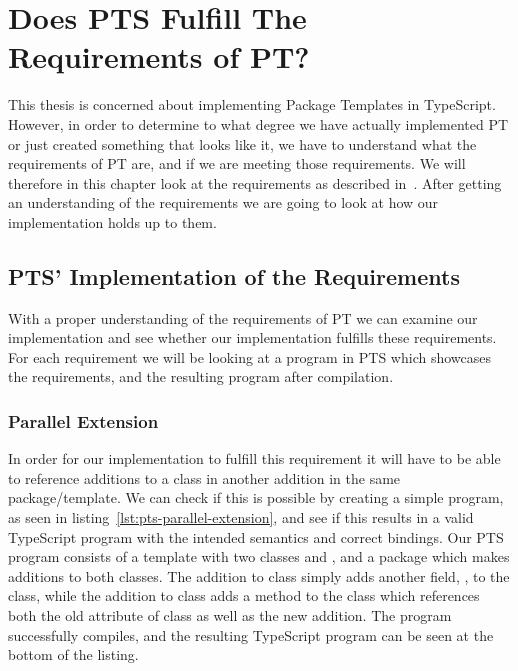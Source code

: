 \chapter{Does PTS Fulfill The Requirements of PT?}\label{ch:does-pts-fulfill-the-requirements-of-pt?}

This thesis is concerned about implementing Package Templates in TypeScript.
However, in order to determine to what degree we have actually implemented PT or just created something that looks like it, we have to understand what the requirements of PT are, and if we are meeting those requirements.
We will therefore in this chapter look at the requirements as described in~\cite{jot}.
After getting an understanding of the requirements we are going to look at how our implementation holds up to them.



\section{PTS' Implementation of the Requirements}\label{sec:pts'-implementation-of-the-requirements}

With a proper understanding of the requirements of PT we can examine our implementation and see whether our implementation fulfills these requirements.
For each requirement we will be looking at a program in PTS which showcases the requirements, and the resulting program after compilation.

\subsection{Parallel Extension}\label{subsec:pts-parallel-extension}

In order for our implementation to fulfill this requirement it will have to be able to reference additions to a class in another addition in the same package/template.
We can check if this is possible by creating a simple program, as seen in listing~\vref{lst:pts-parallel-extension}, and see if this results in a valid TypeScript program with the intended semantics and correct bindings.
Our PTS program consists of a template  with two classes  and , and a package  which makes additions to both classes.
The addition to class  simply adds another field, , to the class, while the addition to class  adds a method to the class which references both the old attribute of class  as well as the new addition.
The program successfully compiles, and the resulting TypeScript program can be seen at the bottom of the listing.

